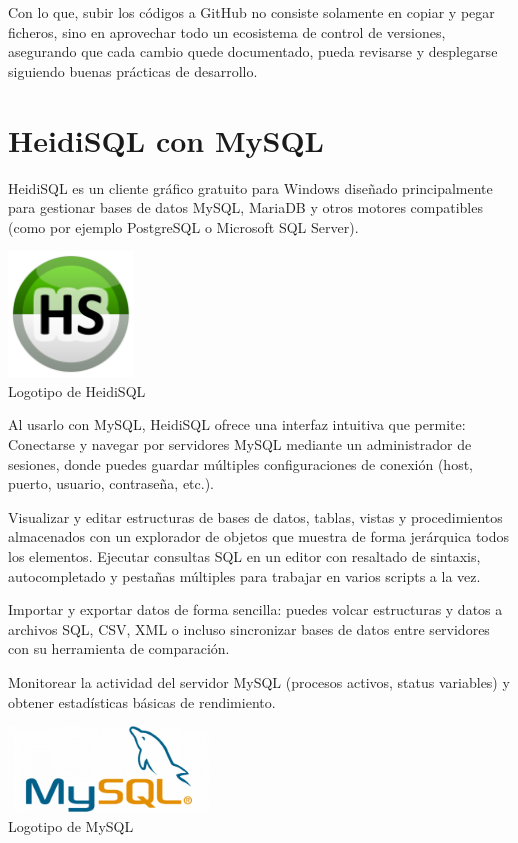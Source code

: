 Con lo que, subir los códigos a GitHub no consiste solamente en copiar y pegar ficheros, sino en aprovechar todo un ecosistema de control de versiones, asegurando que cada cambio quede documentado, pueda revisarse y desplegarse siguiendo buenas prácticas de desarrollo.


\section{HeidiSQL con MySQL}\label{heidi-sql}
HeidiSQL es un cliente gráfico gratuito para Windows diseñado principalmente para gestionar bases de datos MySQL, MariaDB y otros motores compatibles (como por ejemplo PostgreSQL o Microsoft SQL Server). 

\begin{center}
  \includegraphics[width=0.25\textwidth]{img/heidi-logo.png}\\
  \small Logotipo de HeidiSQL
\end{center}

Al usarlo con MySQL, HeidiSQL ofrece una interfaz intuitiva que permite:
Conectarse y navegar por servidores MySQL mediante un administrador de sesiones, donde puedes guardar múltiples configuraciones de conexión (host, puerto, usuario, contraseña, etc.).

Visualizar y editar estructuras de bases de datos, tablas, vistas y procedimientos almacenados con un explorador de objetos que muestra de forma jerárquica todos los elementos.
Ejecutar consultas SQL en un editor con resaltado de sintaxis, autocompletado y pestañas múltiples para trabajar en varios scripts a la vez.

Importar y exportar datos de forma sencilla: puedes volcar estructuras y datos a archivos SQL, CSV, XML o incluso sincronizar bases de datos entre servidores con su herramienta de comparación.

Monitorear la actividad del servidor MySQL (procesos activos, status variables) y obtener estadísticas básicas de rendimiento.

\begin{center}
  \includegraphics[width=0.4\textwidth]{img/mysql-logo.png}\\
  \small Logotipo de MySQL
\end{center}

